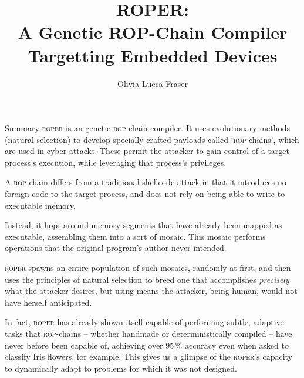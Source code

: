 \documentclass[9pt]{beamer}
\title{ROPER:\\A Genetic ROP-Chain Compiler Targetting Embedded
Devices}
\author{Olivia Lucca Fraser}
\institute{NIMS Lab, Dalhousie University}
\begin{document}
\begin{frame}{Summary}
\textsc{roper} is an genetic \textsc{rop}-chain compiler. It uses evolutionary
methods (natural selection) to develop specially
crafted payloads called `\textsc{rop}-chains', which are used in
cyber-attacks. These permit the attacker to gain control of a
target process's execution, while leveraging that process's
privileges. 

\vspace{4pt}
A \textsc{rop}-chain differs from a traditional shellcode attack
in that it introduces no foreign code to the target process, and
does not rely on being able to write to executable memory. 

\vspace{4pt}
Instead, it hops around memory segments that have 
already been mapped as executable, assembling them into a
sort of mosaic. This mosaic performs operations that the original
program's author never intended. 

\vspace{4pt}
\textsc{roper} spawns an entire population of such mosaics, randomly at
first, and then uses the principles of natural selection 
to breed one that accomplishes \emph{precisely} what the
attacker desires, but using means the attacker, being human,
would not have herself anticipated. 

\vspace{4pt}
In fact, \textsc{roper} has already shown itself capable of
performing subtle, adaptive tasks that \textsc{rop}-chains --
whether handmade or deterministically compiled -- have never
before been capable of, achieving over 95\,\% accuracy even when
asked to classify Iris flowers, for example. This gives us a
glimpse of the \textsc{roper}'s capacity to dynamically adapt to
problems for which it was not designed. 
\end{frame}
\end{document}
